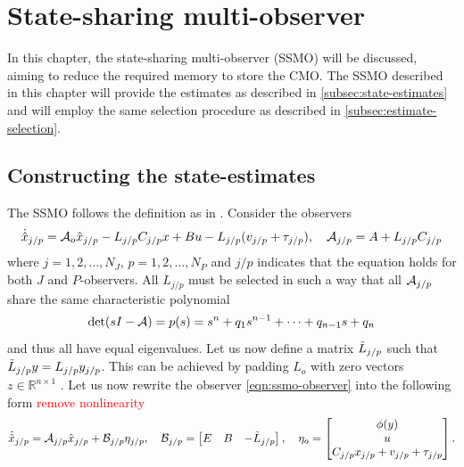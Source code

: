 \section{State-sharing multi-observer}\label{ch:ssmo}
In this chapter, the state-sharing multi-observer (SSMO) will be discussed, aiming to reduce the required memory to store the CMO. The SSMO described in this chapter will provide the estimates as described in \autoref{subsec:state-estimates} and will employ the same selection procedure as described in \autoref{subsec:estimate-selection}.

\subsection{Constructing the state-estimates}
The SSMO follows the definition as in \cite{Chong2023MemoryAlgorithms}. Consider the observers
\begin{equation}\label{eqn:ssmo-observer}
    \begin{split}
        \dot{\hat{x}}_{j/p} &= \mathcal{A}_o\hat{x}_{j/p} - L_{j/p}C_{j/p}x + Bu -L_{j/p}(v_{j/p} + \tau_{j/p}), \quad \mathcal{A}_{j/p}=A+L_{j/p}C_{j/p} \\
    \end{split}
\end{equation}
where $j=1,2,\dots,N_J$, $p=1,2,\dots,N_P$ and $j/p$ indicates that the equation holds for both $J$ and $P$-observers. All $L_{j/p}$ must be selected in such a way that all $\mathcal{A}_{j/p}$ share the same characteristic polynomial
\begin{equation}\label{eqn:ssmo-char-poly}
    \det(sI-\mathcal{A}) = p(s) = s^n + q_1s^{n-1} + \dots + q_{n-1}s + q_n
\end{equation}
and thus all have equal eigenvalues. Let us now define a matrix $\Tilde{L}_{j/p}$ such that $\Tilde{L}_{j/p}y=L_{j/p}y_{j/p}$. This can be achieved by padding $L_o$ with zero vectors $z \in \mathbb{R}^{n \times 1}$ \cite{Chong2023MemoryAlgorithms}. Let us now rewrite the observer \eqref{eqn:ssmo-observer} into the following form \textcolor{red}{remove nonlinearity}
\begin{equation}\label{eqn:ssmo-standard-system-form}
    \dot{\hat{x}}_{j/p} = \mathcal{A}_{j/p}\hat{x}_{j/p} + \mathcal{B}_{j/p}\eta_{j/p}, \quad
    \mathcal{B}_{j/p} =
    \begin{bmatrix}
        E & B & -\Tilde{L}_{j/p} \\
    \end{bmatrix}, \quad \eta_o =
    \begin{bmatrix}
        \phi(y) \\
        u \\
        C_{j/p}x_{j/p} + v_{j/p} + \tau_{j/p}
    \end{bmatrix}.
\end{equation}

